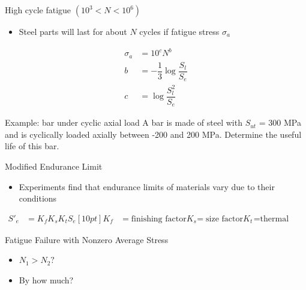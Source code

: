 \documentclass[10pt, svgnames]{beamer}
\begin{document}
\begin{frame}[label={sec:orga941175}]{High cycle fatigue \((10^3 < N < 10^6)\)}
\begin{itemize}
\item Steel parts will last for about \(N\) cycles if fatigue stress \(\sigma_a\)
\end{itemize}

\begin{align*}
	\sigma_a &= 10^c N^b \\
	b &= -\dfrac{1}{3}   \log\dfrac{S_l}{S_e} \\
	c &= \log \dfrac{S_l^2}{S_e}
\end{align*}
\end{frame}


\begin{frame}[label={sec:org40f48c5}]{Example: bar under cyclic axial load}
A bar is made of steel with \(S_{ut}\) = 300 MPa and is cyclically loaded axially between -200 and 200 MPa. Determine the useful life of this bar.
\end{frame}



\begin{frame}[label={sec:org177beed}]{Modified Endurance Limit}
\begin{itemize}
\item Experiments find that endurance limits of materials vary due to their conditions
\end{itemize}

\begin{align*}
S'_e &= K_f K_s K_t S_e  [10pt]
K_f &= \text{finishing factor}
K_s &= \text{size factor}
K_t &= \text{thermal factor}
\end{align*}
\end{frame}


\begin{frame}[label={sec:org7c2db6f}]{Fatigue Failure with Nonzero Average Stress}


\begin{itemize}
\item \(N_1 > N_2 ?\)
\item By how much?
\end{itemize}
\end{frame}
\end{document}
